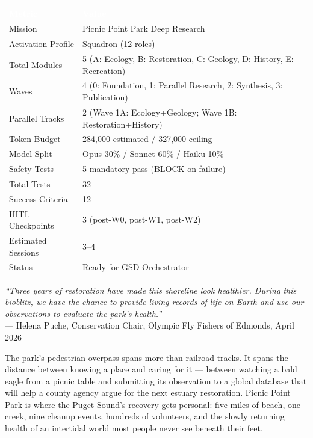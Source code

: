 \documentclass[11pt,letterpaper]{article}
\newcommand{\tableheader}[1]{\textbf{\sffamily\textcolor{white}{#1}}}
\begin{document}
\begin{center}
\begin{tabularx}{\textwidth}{L{4cm}X}
\toprule
{}
\tableheader{Metric} & \tableheader{Value} \\
\midrule
Mission & Picnic Point Park Deep Research \\
Activation Profile & Squadron (12 roles) \\
Total Modules & 5 (A: Ecology, B: Restoration, C: Geology, D: History, E: Recreation) \\
Waves & 4 (0: Foundation, 1: Parallel Research, 2: Synthesis, 3: Publication) \\
Parallel Tracks & 2 (Wave 1A: Ecology+Geology; Wave 1B: Restoration+History) \\
Token Budget & 284,000 estimated / 327,000 ceiling \\
Model Split & Opus 30\% / Sonnet 60\% / Haiku 10\% \\
Safety Tests & 5 mandatory-pass (BLOCK on failure) \\
Total Tests & 32 \\
Success Criteria & 12 \\
HITL Checkpoints & 3 (post-W0, post-W1, post-W2) \\
Estimated Sessions & 3--4 \\
Status & Ready for GSD Orchestrator \\
\bottomrule
\end{tabularx}
\end{center}

\vspace{2em}

\begin{quotebox}
\textit{``Three years of restoration have made this shoreline look healthier. During this bioblitz, we have the chance to provide living records of life on Earth and use our observations to evaluate the park's health.''} \\[0.5em]
\hspace*{\fill}--- Helena Puche, Conservation Chair, Olympic Fly Fishers of Edmonds, April 2026

\vspace{0.8em}
The park's pedestrian overpass spans more than railroad tracks. It spans the distance between knowing a place and caring for it --- between watching a bald eagle from a picnic table and submitting its observation to a global database that will help a county agency argue for the next estuary restoration. Picnic Point Park is where the Puget Sound's recovery gets personal: five miles of beach, one creek, nine cleanup events, hundreds of volunteers, and the slowly returning health of an intertidal world most people never see beneath their feet.
\end{quotebox}
\end{document}
